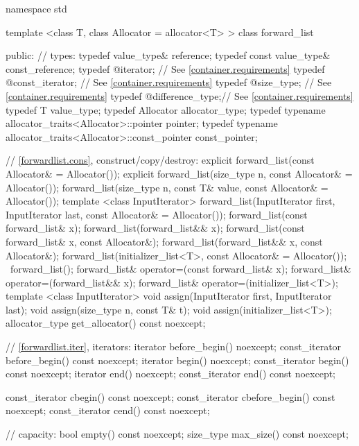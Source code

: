 \begin{codeblock}
namespace std {
  template <class T, class Allocator = allocator<T> >
  class forward_list {
  public:
    // types:
    typedef value_type&                                           reference;
    typedef const value_type&                                     const_reference;
    typedef @\impdef@ iterator;       // See \ref{container.requirements}
    typedef @\impdef@ const_iterator; // See \ref{container.requirements}
    typedef @\impdef@ size_type;      // See \ref{container.requirements}
    typedef @\impdef@ difference_type;// See \ref{container.requirements}
    typedef T value_type;
    typedef Allocator allocator_type;
    typedef typename allocator_traits<Allocator>::pointer         pointer;
    typedef typename allocator_traits<Allocator>::const_pointer   const_pointer;

    // \ref{forwardlist.cons}, construct/copy/destroy:
    explicit forward_list(const Allocator& = Allocator());
    explicit forward_list(size_type n, const Allocator& = Allocator());
    forward_list(size_type n, const T& value,
                 const Allocator& = Allocator());
    template <class InputIterator>
      forward_list(InputIterator first, InputIterator last,
                   const Allocator& = Allocator());
    forward_list(const forward_list& x);
    forward_list(forward_list&& x);
    forward_list(const forward_list& x, const Allocator&);
    forward_list(forward_list&& x, const Allocator&);
    forward_list(initializer_list<T>, const Allocator& = Allocator());
    ~forward_list();
    forward_list& operator=(const forward_list& x);
    forward_list& operator=(forward_list&& x);
    forward_list& operator=(initializer_list<T>);
    template <class InputIterator>
      void assign(InputIterator first, InputIterator last);
    void assign(size_type n, const T& t);
    void assign(initializer_list<T>);
    allocator_type get_allocator() const noexcept;

    // \ref{forwardlist.iter}, iterators:
    iterator before_begin() noexcept;
    const_iterator before_begin() const noexcept;
    iterator begin() noexcept;
    const_iterator begin() const noexcept;
    iterator end() noexcept;
    const_iterator end() const noexcept;

    const_iterator cbegin() const noexcept;
    const_iterator cbefore_begin() const noexcept;
    const_iterator cend() const noexcept;

    // capacity:
    bool empty() const noexcept;
    size_type max_size() const noexcept;

}}
\end{codeblock}
